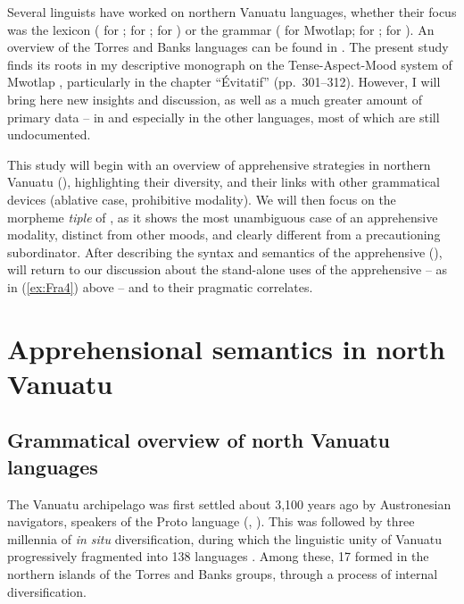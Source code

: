 \documentclass[output=paper,colorlinks,citecolor=brown]{langscibook}
\begin{document}
Several linguists have worked on northern Vanuatu languages, whether their focus was the lexicon (\citealt{CodringtonPalmer1896} for ; \citealt{Malau2021} for ; \citealt{François2022b} for ) or the grammar (\citealt{François2001,francois2003} for \mbox{Mwotlap}; \citealt{Schnell2011} for ; \citealt{Malau2016} for ). An overview of the Torres and Banks languages can be found in \citet{François2011,François2012}. The present study finds its roots in my descriptive monograph on the Tense-Aspect-Mood system of \mbox{Mwotlap} \citep{francois2003}, particularly in the chapter ``Évitatif'' (pp.~301--312). However, I will bring here new insights and discussion, as well as a much greater amount of primary data -- in  and especially in the other languages, most of which are still undocumented.

This study will begin with an overview of apprehensive strategies in northern Vanuatu (), highlighting their diversity, and their links with other grammatical devices (ablative case, prohibitive modality). We will then focus on the morpheme \textit{tiple} of , as it shows the most unambiguous case of an apprehensive modality, distinct from other moods, and clearly different from a precautioning subordinator. After describing the syntax and semantics of the  apprehensive (),  will return to our discussion about the stand-alone uses of the apprehensive -- as in (\ref{ex:Fra4}) above -- and to their pragmatic correlates.
 

\section{Apprehensional semantics in north Vanuatu}
\label{sec:apprehensionalsemantics}

\subsection{Grammatical overview of north Vanuatu languages}
\label{subsec:grammoverview}

 
The Vanuatu archipelago was first settled about 3,100 years ago by Austronesian navigators, speakers of the Proto  language (\citealt{BedfordSpriggs2008}, \citealt{Lipsonetal2020}). This was followed by three millennia of \textit{in situ} diversification, during which the linguistic unity of Vanuatu progressively fragmented into 138 languages \citep{Françoisetal2015}. Among these, 17 formed in the northern islands of the Torres and Banks groups, through a process of internal diversification.
\end{document}
